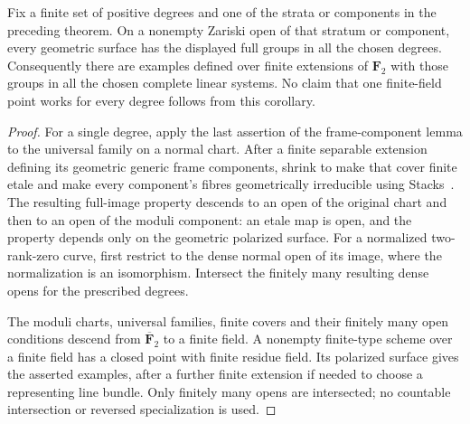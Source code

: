 \begin{corollary}
\label{cor:generic-nonordinary-ppav-finite-degrees-candidate}
Fix a finite set of positive degrees and one of the strata
or components in the preceding theorem. On a nonempty
Zariski open of that stratum or component, every geometric
surface has the displayed full groups in all the chosen
degrees. Consequently there are examples defined over
finite extensions of $\mathbf F_2$ with those groups in
all the chosen complete linear systems.
No claim that one finite-field point works for every
degree follows from this corollary.
\end{corollary}

\begin{proof}
For a single degree, apply the last assertion of the
frame-component lemma to the universal family on a
normal chart. After a finite separable extension defining
its geometric generic frame components, shrink to make
that cover finite etale and make every component's fibres
geometrically irreducible using Stacks~\cite{Stacks0559}.
The resulting full-image property descends to an open
of the original chart and then to an open of the moduli
component: an etale map is open, and the property depends
only on the geometric polarized surface. For a normalized
two-rank-zero curve, first restrict to the dense normal
open of its image, where the normalization is an
isomorphism. Intersect the finitely many resulting dense
opens for the prescribed degrees.

The moduli charts, universal families, finite covers and
their finitely many open conditions descend from
$\overline{\mathbf F}_2$ to a finite field. A nonempty
finite-type scheme over a finite field has a closed
point with finite residue field. Its polarized surface
gives the asserted examples, after a further finite
extension if needed to choose a representing line bundle.
Only finitely many opens are intersected; no countable
intersection or reversed specialization is used.
\end{proof}
